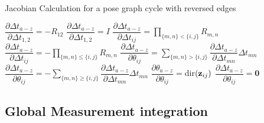 \begin{algorithm}[H]
  \caption{Jacobian Calculation for a pose graph cycle with reversed edges}\label{algo:reversed}
  \begin{algorithmic}[1]
      \State $\dfrac{\partial \Delta t_{a-z}}{\partial \Delta t_{1,2}} = -R_{12}$
    \Else
      \State $\dfrac{\partial \Delta t_{a-z}}{\partial \Delta t_{1,2}} = I$
    \EndIf
        \State $\dfrac{\partial \Delta t_{a-z}}{\partial \Delta t_{ij}} = \prod_{\{m,n\} < \{i,j\}} R_{m,n}$
      \Else
        \State $\dfrac{\partial \Delta t_{a-z}}{\partial \Delta t_{ij}} = -\prod_{\{m,n\} \leq \{i,j\}} R_{m,n}$
      \EndIf
    \EndFor
        \State $\dfrac{\partial \Delta t_{a-z}}{\partial \theta_{ij}} = \sum_{\{m,n\} > \{i,j\}} \dfrac{\partial \Delta t_{a-z}}{\partial \Delta t_{mn}} \Delta t_{mn}$
      \Else
        \State $\dfrac{\partial \Delta t_{a-z}}{\partial \theta_{ij}} =
        - \sum_{\{m,n\} \geq \{i,j\}} \dfrac{\partial \Delta t_{a-z}}{\partial \Delta t_{mn}} \Delta t_{mn}$
      \EndIf
      \State $\dfrac{\partial \theta_{a-z}}{\partial \theta_{ij}} = $dir$\left( \mathbf{z}_{ij} \right)$
      \State $\dfrac{\partial \Delta t_{a-z}}{\partial \theta_{ij}} = \textbf{0}$
    \EndFor
  \end{algorithmic}
\end{algorithm}

\subsection{Global Measurement integration}

